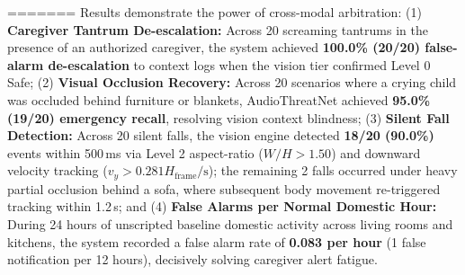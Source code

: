 \documentclass[conference]{IEEEtran}
\begin{document}
\begin{table}[htbp]
\caption{Measured End-to-End Latency Budget (Subsystems A and B Execute Concurrently)}
=======
Results demonstrate the power of cross-modal arbitration: (1) \textbf{Caregiver Tantrum De-escalation:} Across 20 screaming tantrums in the presence of an authorized caregiver, the system achieved \textbf{100.0\% (20/20) false-alarm de-escalation} to context logs when the vision tier confirmed Level 0 Safe; (2) \textbf{Visual Occlusion Recovery:} Across 20 scenarios where a crying child was occluded behind furniture or blankets, AudioThreatNet achieved \textbf{95.0\% (19/20) emergency recall}, resolving vision context blindness; (3) \textbf{Silent Fall Detection:} Across 20 silent falls, the vision engine detected \textbf{18/20 (90.0\%)} events within 500\,ms via Level 2 aspect-ratio ($W/H > 1.50$) and downward velocity tracking ($v_y > 0.281 H_{\text{frame}}/\text{s}$); the remaining 2 falls occurred under heavy partial occlusion behind a sofa, where subsequent body movement re-triggered tracking within 1.2\,s; and (4) \textbf{False Alarms per Normal Domestic Hour:} During 24 hours of unscripted baseline domestic activity across living rooms and kitchens, the system recorded a false alarm rate of \textbf{0.083 per hour} (1 false notification per 12 hours), decisively solving caregiver alert fatigue.


\end{table}
\end{document}
